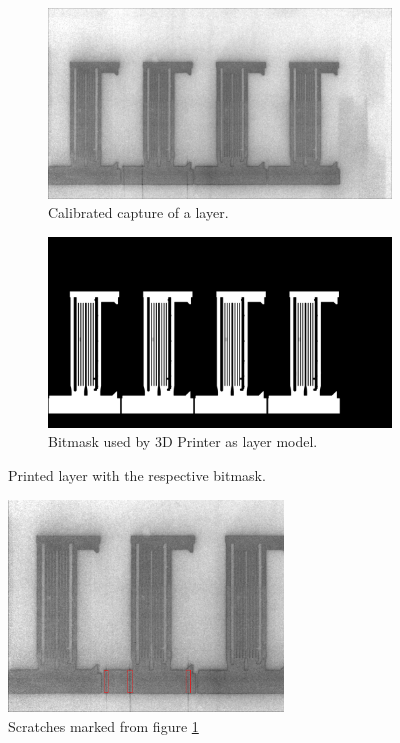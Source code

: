 \begin{figure}[ht]
  \centering

  \begin{subfigure}{\textwidth}
    \includegraphics[width=\textwidth]{images/layer_00325}
    \caption{Calibrated capture of a layer.}
    \label{fig:layer}
  \end{subfigure}

  \begin{subfigure}{\textwidth}
    \includegraphics[width=\textwidth]{images/bitmask_00325}
    \caption{Bitmask used by 3D Printer as layer model.}
  \end{subfigure}

  \caption{Printed layer with the respective bitmask.}
  \label{fig:layer_bitmask}

\end{figure}


\begin{figure}[ht]
  \includegraphics[width=0.65\textwidth]{images/layer_00325_marked_cropped}
  \centering
  \caption{Scratches marked from figure \ref{fig:layer}}
  \label{fig:layer_00325_marked_cropped}
\end{figure}

